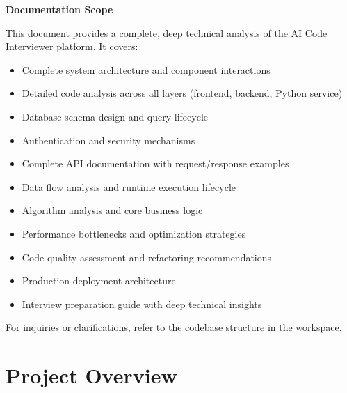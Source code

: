 \documentclass[12pt,a4paper,oneside]{article}
\begin{document}
\begin{center}
    \vspace{2cm}
    
    {\Large \textbf{Documentation Scope}}
    
    This document provides a complete, deep technical analysis of the AI Code Interviewer platform. It covers:
    \begin{itemize}
        \item Complete system architecture and component interactions
        \item Detailed code analysis across all layers (frontend, backend, Python service)
        \item Database schema design and query lifecycle
        \item Authentication and security mechanisms
        \item Complete API documentation with request/response examples
        \item Data flow analysis and runtime execution lifecycle
        \item Algorithm analysis and core business logic
        \item Performance bottlenecks and optimization strategies
        \item Code quality assessment and refactoring recommendations
        \item Production deployment architecture
        \item Interview preparation guide with deep technical insights
    \end{itemize}
    
    \vfill
    
    {\small For inquiries or clarifications, refer to the codebase structure in the workspace.}
    
\end{center}

\newpage


\setcounter{tocdepth}{2}
\tableofcontents

\newpage


\section{Project Overview}
\end{document}
